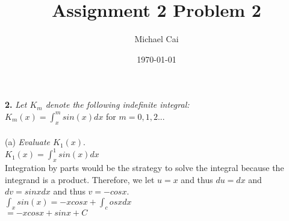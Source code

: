 \documentclass[11pt, oneside]{article}   	%
\title{Assignment 2 Problem 2}
\author{Michael Cai}
\date{\today}							%
\begin{document}
\maketitle

\noindent \textbf{2.} \textit{Let $K_m$ denote the following indefinite integral:}\\
$K_m(x) = \int_ x^m sin(x)dx$ for $m = 0,1,2...$\\~\\
(a) \textit{Evaluate $K_1(x)$}. \\
$K_1(x) = \int_ x^1 sin(x)dx$\\
Integration by parts would be the strategy to solve the integral because the integrand is a product. Therefore, we let $u = x$ and thus $du = dx$ and $dv = sinxdx$ and thus $v = -cosx$.\\
$\int_ xsin(x) = -xcosx + \int_ cosxdx$ \\
$ = -xcosx + sinx + C$

\end{document}
